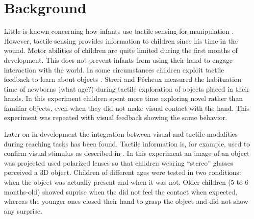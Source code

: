 \section{Background}
\label{sec:background}

Little is known concerning how infants use tactile sensing for
manipulation \cite{streri93Seeing}.
However, tactile sensing provides information to children since
his time in the wound. Motor abilities of children are quite 
limited during the first months of development. This does not 
prevent infants from using their hand to engage interaction 
with the world.
In some circumstances children exploit tactile feedback to learn
about objects \cite{streri86Habituation}. 
Streri and P\^{e}cheux measured the habituation time of newborns 
(what age?) during tactile exploration of objects placed in their hands. 
In this experiment children spent more time exploring novel rather than familiar 
objects, even when they did not make visual contact with the hand. This experiment 
was repeated with visual feedback showing the same behavior.

Later on in development the integration between visual and tactile 
modalities during reaching tasks has been found. Tactile information 
is, for example, used to confirm visual stimulus as described 
in \cite{bower70Coordination}. 
In this experiment an image of an object was projected
used polarized lenses so that children wearing ``stereo'' glasses
perceived a 3D object. Children of different ages were tested in 
two conditions: when the object was actually present and when it 
was not. Older children (5 to 6 months-old) showed suprise when 
the did not feel the contact when expected, whereas the younger 
ones closed their hand to grasp the object and did not show any 
surprise.

